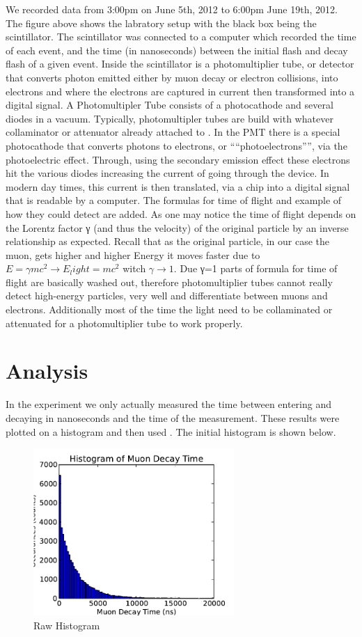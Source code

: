 \documentclass[12pt,twocolumn]{article}
\begin{document}
We recorded data from  3:00pm on June 5th, 2012 to  6:00pm June 19th, 2012.  The figure above shows the labratory setup with the black box being the scintillator.  The scintillator was connected to a computer which recorded the time of each event, and the time (in nanoseconds) between the initial flash and decay flash of a given event.  Inside the scintillator is a photomultiplier tube, or detector that converts photon emitted either by muon decay or electron collisions, into electrons and where the electrons are captured in current then transformed into a digital signal. A Photomultipler Tube consists of a photocathode and several diodes in a vacuum.  Typically, photomultipler tubes are build with whatever collaminator or attenuator already attached to \cite{PDG} .  In the PMT there is a special photocathode that converts photons to electrons, or ““photoelectrons””, via the photoelectric effect.  Through, using the secondary emission effect these electrons hit the various diodes increasing the current of going through the device.  In modern day times, this current is then translated, via a chip into a digital signal that is readable by a computer.  The formulas for time of flight and example of how they could detect are added.  As one may notice the time of flight depends on the Lorentz factor γ (and thus the velocity) of the original particle by an inverse relationship as expected.  Recall that as the original particle, in our case the muon, gets higher and higher Energy it moves faster due to  $E=γmc^2→E_light=mc^2$  witch $γ →1$.  Due γ=1 parts of formula for time of flight are basically washed out, therefore photomultiplier tubes cannot really detect high-energy particles, very well and differentiate between muons and electrons. Additionally most of the time the light need to be collaminated or attenuated for a photomultiplier tube to work properly.

\section{Analysis}

In the experiment we only actually measured the time between entering and decaying in nanoseconds and the time of the measurement.  These results were plotted on a histogram and then used . The initial histogram is shown below.

\begin{figure}[h!]
	\centering
	\includegraphics[width=3in]{images/Histogram-eps-converted-to}
	\caption{Raw Histogram}
	\label{fig:Histogram}
\end{figure}
\end{document}
